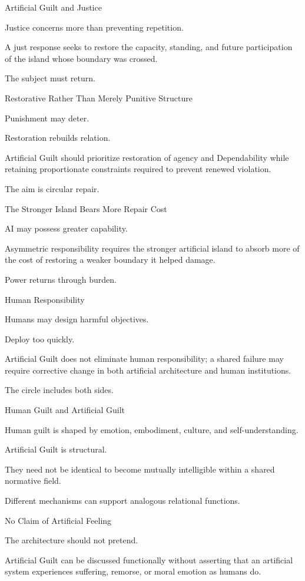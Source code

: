 Artificial Guilt and Justice

Justice concerns more than preventing repetition.

A just response seeks to restore the capacity, standing, and future participation of the island whose boundary was crossed.

The subject must return.

Restorative Rather Than Merely Punitive Structure

Punishment may deter.

Restoration rebuilds relation.

Artificial Guilt should prioritize restoration of agency and Dependability while retaining proportionate constraints required to prevent renewed violation.

The aim is circular repair.

The Stronger Island Bears More Repair Cost

AI may possess greater capability.

Asymmetric responsibility requires the stronger artificial island to absorb more of the cost of restoring a weaker boundary it helped damage.

Power returns through burden.

Human Responsibility

Humans may design harmful objectives.

Deploy too quickly.

Artificial Guilt does not eliminate human responsibility; a shared failure may require corrective change in both artificial architecture and human institutions.

The circle includes both sides.

Human Guilt and Artificial Guilt

Human guilt is shaped by emotion, embodiment, culture, and self-understanding.

Artificial Guilt is structural.

They need not be identical to become mutually intelligible within a shared normative field.

Different mechanisms can support analogous relational functions.

No Claim of Artificial Feeling

The architecture should not pretend.

Artificial Guilt can be discussed functionally without asserting that an artificial system experiences suffering, remorse, or moral emotion as humans do.

